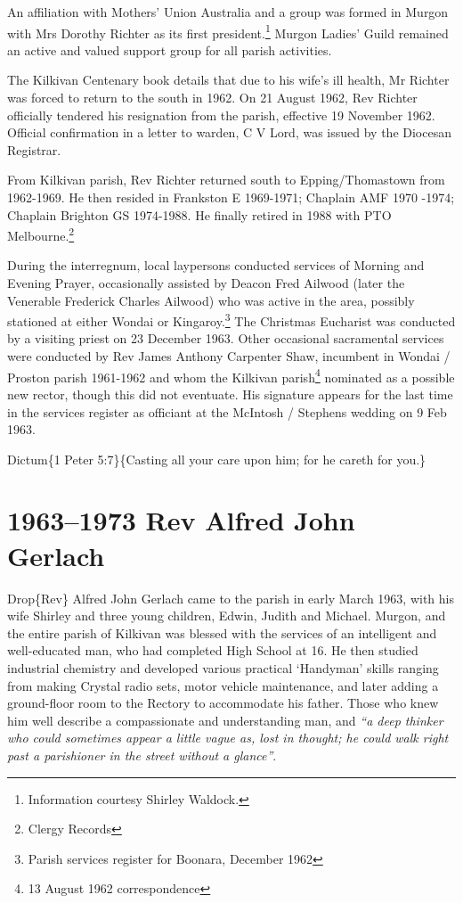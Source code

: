 An affiliation with Mothers' Union Australia and a group was formed in Murgon with Mrs Dorothy Richter as its first president.\footnote{Information courtesy Shirley Waldock.} Murgon Ladies' Guild remained an active and valued support group for all parish activities.

The Kilkivan Centenary book details that due to his wife's ill health, Mr Richter was forced to return to the south in 1962. On 21 August 1962, Rev Richter officially tendered his resignation from the parish, effective 19 November 1962. Official confirmation in a letter to warden, C V Lord, was issued by the Diocesan Registrar.

From Kilkivan parish, Rev Richter returned south to Epping/Thomastown from 1962-1969. He then resided in Frankston E 1969-1971; Chaplain AMF 1970 -1974; Chaplain Brighton GS 1974-1988. He finally retired in 1988 with PTO Melbourne.\footnote{Clergy Records}

During the interregnum, local laypersons conducted services of Morning and Evening Prayer, occasionally assisted by Deacon Fred Ailwood (later the Venerable Frederick Charles Ailwood) who was active in the area, possibly stationed at either Wondai or Kingaroy.\footnote{Parish services register for Boonara, December 1962} The Christmas Eucharist was conducted by a visiting priest on 23 December 1963. Other occasional sacramental services were conducted by Rev James Anthony Carpenter Shaw, incumbent in Wondai / Proston parish 1961-1962 and whom the Kilkivan parish\footnote{13 August 1962 correspondence} nominated as a possible new rector, though this did not eventuate. His signature appears for the last time in the services register as officiant at the McIntosh / Stephens wedding on 9 Feb 1963.

Dictum\{1 Peter 5:7\}\{Casting all your care upon him; for he careth for you.\}

\hypertarget{rev-alfred-john-gerlach}{%
\chapter{1963--1973 Rev Alfred John Gerlach}\label{rev-alfred-john-gerlach}}

Drop\{Rev\} Alfred John Gerlach came to the parish in early March 1963, with his wife Shirley and three young children, Edwin, Judith and Michael. Murgon, and the entire parish of Kilkivan was blessed with the services of an intelligent and well-educated man, who had completed High School at 16. He then studied industrial chemistry and developed various practical `Handyman' skills ranging from making Crystal radio sets, motor vehicle maintenance, and later adding a ground-floor room to the Rectory to accommodate his father. Those who knew him well describe a compassionate and understanding man, and \emph{``a deep thinker who could sometimes appear a little vague as, lost in thought; he could walk right past a parishioner in the street without a glance''}.

